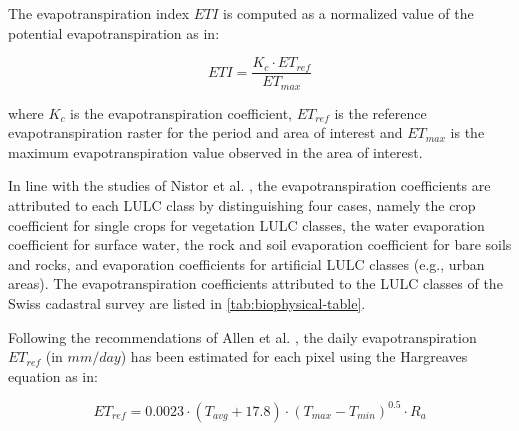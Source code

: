\documentclass[12pt]{iopart}
\begin{document}

The evapotranspiration index $ETI$ is computed as a normalized value of the potential evapotranspiration as in:

\begin{equation}
  \label{eq:evapotranspiration-index}
  ETI = \frac{K_c \cdot ET_{ref}}{ET_{max}}
\end{equation}

where $K_c$ is the evapotranspiration coefficient, $ET_{ref}$ is the reference evapotranspiration raster for the period and area of interest and $ET_{max}$ is the maximum evapotranspiration value observed in the area of interest.


In line with the studies of Nistor et al. \cite{nistor2015compute,nistor2016climate,nistor2016mapping}, the evapotranspiration coefficients are attributed to each LULC class by distinguishing four cases, namely the crop coefficient for single crops for vegetation LULC classes, the water evaporation coefficient for surface water, the rock and soil evaporation coefficient for bare soils and rocks, and evaporation coefficients for artificial LULC classes (e.g., urban areas).
The evapotranspiration coefficients attributed to the LULC classes of the Swiss cadastral survey are listed in \autoref{tab:biophysical-table}.


Following the recommendations of Allen et al. \cite{allen1998crop}, the daily evapotranspiration $ET_{ref}$ (in $mm/day$) has been estimated for each pixel using the Hargreaves equation \cite{hargreaves1985reference} as in:

\begin{equation}
  \label{eq:ref-evapotranspiration}
  ET_{ref} = 0.0023 \cdot (T_{avg} + 17.8) \cdot (T_{max} - T_{min})^{0.5} \cdot R_a
\end{equation}
\end{document}
